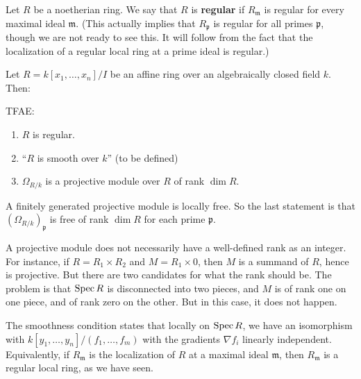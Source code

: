 \begin{definition} 
Let $R$ be a noetherian ring. We say that $R$ is \textbf{regular} if
$R_{\mathfrak{m}}$ is regular for every maximal ideal $\mathfrak{m}$. (This
actually implies that $R_{\mathfrak{p}}$ is regular for all primes
$\mathfrak{p}$, though we are not ready to see this. It will follow from the
fact that the localization of a regular local ring at a prime ideal is regular.)
\end{definition} 

Let $R = k[x_1, \dots, x_n]/I$ be an affine ring over an algebraically closed
field $k$. 
Then:

\begin{proposition} 
TFAE:
\begin{enumerate}
\item $R$ is regular. 
\item ``$R$ is smooth over $k$'' (to be defined)
\item  $\Omega_{R/k}$ is  a projective module over $R$ of rank $\dim R$.
\end{enumerate}
\end{proposition} 
A finitely generated projective module is locally free. So the last statement is that
$(\Omega_{R/k})_{\mathfrak{p}}$ is free of rank $\dim R$ for each prime
$\mathfrak{p}$.

\begin{remark} 
A projective module does not necessarily have a well-defined rank as an integer. For
instance, if $R = R_1 \times R_2$ and $M = R_1 \times 0$, then $M$ is a summand
of $R$, hence is projective. But there are two candidates for what the rank
should be. The problem is that $\operatorname{Spec} R$ is disconnected into two pieces, and
$M$ is of rank one on one piece, and of rank zero on the other.
But in this case, it does not happen.
\end{remark}

\begin{remark} 
The smoothness condition states that locally on $\operatorname{Spec} R$, we have an isomorphism with
$k[y_1, \dots, y_n]/(f_1, \dots, f_m)$ with the gradients $\nabla f_i$ linearly
independent. Equivalently, if $R_{\mathfrak{m}}$ is the localization of $R$ at
a maximal ideal  $\mathfrak{m}$, then $R_{\mathfrak{m}}$ is a regular local
ring, as we have seen.
\end{remark} 

